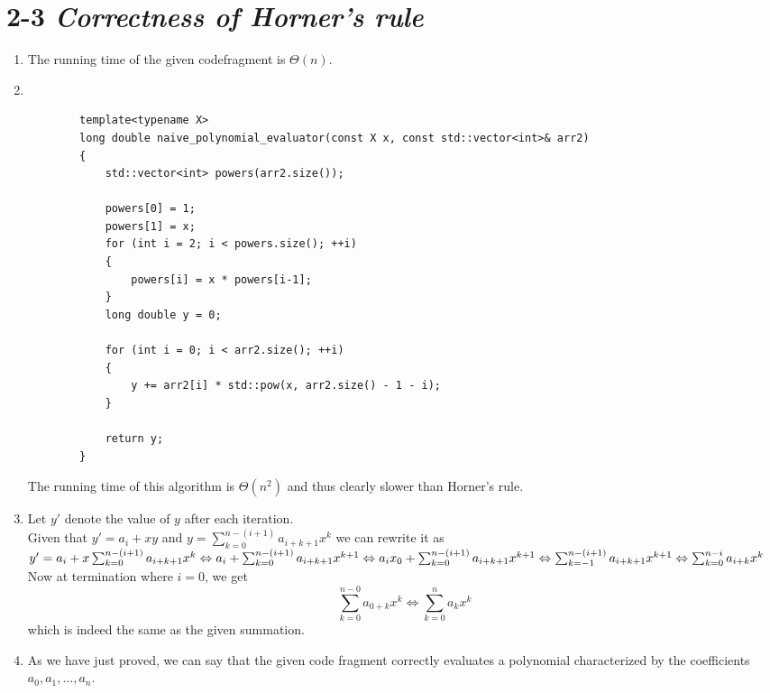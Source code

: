\documentclass[11pt]{article}
\begin{document}
\section*{2-3 \textit{Correctness of Horner's rule}}
\begin{enumerate}[label=\alph*)]
    \item
        The running time of the given codefragment is $\Theta (n)$.
    \item
        ~\\
        \begin{lstlisting}
        template<typename X>
        long double naive_polynomial_evaluator(const X x, const std::vector<int>& arr2)
        {
            std::vector<int> powers(arr2.size());

            powers[0] = 1;
            powers[1] = x;
            for (int i = 2; i < powers.size(); ++i)
            {
                powers[i] = x * powers[i-1];
            }
            long double y = 0;

            for (int i = 0; i < arr2.size(); ++i)
            {
                y += arr2[i] * std::pow(x, arr2.size() - 1 - i);
            }

            return y;
        }
        \end{lstlisting}
        The running time of this algorithm is $\Theta (n^2)$ and thus clearly slower 
        than Horner's rule.
    \item
        Let $y'$ denote the value of $y$ after each iteration.\\
        Given that $y' = a_i + xy$ and $y = \sum_{k=0}^{n-(i+1)} a_{i+k+1}x^k$ we 
        can rewrite it as \\$y'=a_i + x \sum_{k=0}^{n-(i+1)} a_{i+k+1}x^k\\
        \Leftrightarrow
        a_i + \sum_{k=0}^{n-(i+1)} a_{i+k+1}x^{k+1}\\
        \Leftrightarrow
        a_i x_0 + \sum_{k=0}^{n-(i+1)} a_{i+k+1}x^{k+1}\\
        \Leftrightarrow
        \sum_{k=-1}^{n-(i+1)} a_{i+k+1}x^{k+1}\\
        \Leftrightarrow
        \sum_{k=0}^{n-i} a_{i+k}x^{k}\\
        $
        Now at termination where $i = 0$, we get
        \begin{equation}
        \sum_{k=0}^{n-0} a_{0+k}x^{k} \Leftrightarrow \sum_{k=0}^{n} a_{k}x^{k}
        \end{equation}
        which is indeed the same as the given summation.
    \item
        As we have just proved, we can say that the given code fragment correctly
        evaluates a polynomial characterized by the coefficients $a_0,a_1,\dots,a_n$.
\end{enumerate}
\pagebreak
\end{document}
